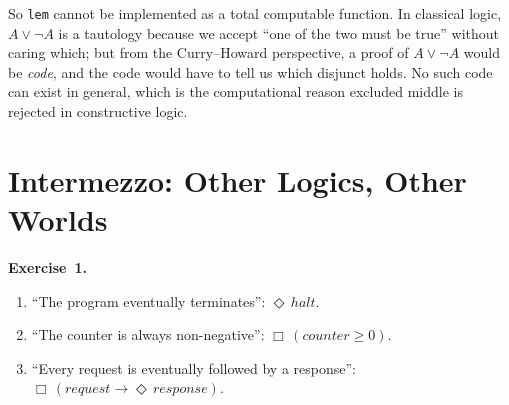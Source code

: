 \documentclass[11pt]{article}
\begin{document}
So \texttt{lem} cannot be implemented as a total computable function.
In classical logic, $A \vee \lnot A$ is a tautology because we accept
``one of the two must be true'' without caring which; but from the
Curry--Howard perspective, a proof of $A \vee \lnot A$ would be
\emph{code}, and the code would have to tell us which disjunct holds.
No such code can exist in general, which is the computational reason
excluded middle is rejected in constructive logic.

\section*{Intermezzo: Other Logics, Other Worlds}

\textbf{Exercise~1.}
\begin{enumerate}[label=(\alph*)]
  \item ``The program eventually terminates'':
        $\Diamond\, \mathit{halt}$.

  \item ``The counter is always non-negative'':
        $\Box\, (\mathit{counter} \geq 0)$.

  \item ``Every request is eventually followed by a response'':
        $\Box\,(\mathit{request} \to \Diamond\, \mathit{response})$.
\end{enumerate}
\end{document}
